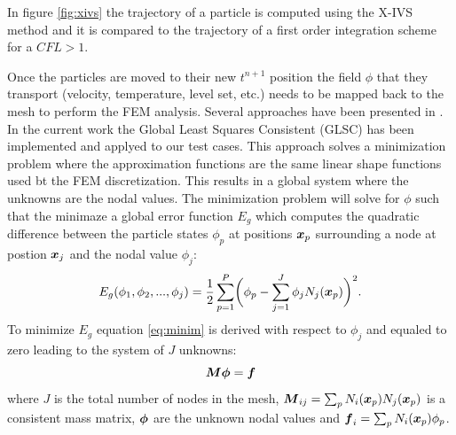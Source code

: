 In figure \ref{fig:xivs} the trajectory of a particle is computed using the X-IVS method and it is compared to the trajectory of a first order integration scheme for a $CFL>1$. 

Once the particles are moved to their new $t^{n+1}$ position the field $\phi$ that they transport (velocity, temperature, level set, etc.) needs to be mapped back to the mesh to perform the FEM analysis. Several approaches have been presented in \cite{gimenez:tesis}. In the current work the  Global Least Squares Consistent (GLSC) has been implemented and applyed to our test cases. This approach solves a minimization problem where the approximation functions are the same linear shape functions used bt the FEM discretization. This results in a global system where the unknowns are the nodal values. The minimization problem will solve for $\phi$ such that the minimaze a global error function $E_g$ which computes the quadratic difference between the particle states $\phi_p$ at positions $\boldsymbol{x}_p$ surrounding a node at postion $\boldsymbol{x}_j$ and the nodal value $\phi_j$:
\begin{equation}\label{eq:minim}
  E_g(\phi_1,\phi_2,...,\phi_j)=\frac{1}{2}\sum_{p=1}^P \biggl(\phi_p-\sum_{j=1}^J\phi_jN_j(\boldsymbol{x}_p)\biggr)^2.
\end{equation}
To minimize $E_g$ equation \ref{eq:minim} is derived with respect to $\phi_j$ and equaled to zero leading to the system of $J$ unknowns:
\begin{equation}
  \boldsymbol{M}\boldsymbol{\phi}=\boldsymbol{f}
\end{equation}
where $J$ is the total number of nodes in the mesh, $\boldsymbol{M}_{ij}=\sum_pN_i(\boldsymbol{x}_p)N_j(\boldsymbol{x}_p)$ is a consistent mass matrix, $\boldsymbol{\phi}$ are the unknown nodal values and $\boldsymbol{f}_i=\sum_pN_i(\boldsymbol{x}_p)\phi_p$.

